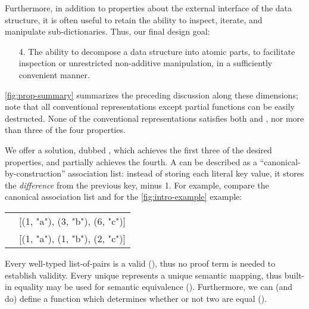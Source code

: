 Furthermore, in addition to properties about the external interface of the data structure, it is often useful to retain the ability to inspect, iterate, and manipulate sub-dictionaries.
%
Thus, our final design goal:

\begin{enumerate}

\item[4.]
%
\designGoal{\EzDstr}
%
The ability to decompose a data structure into atomic parts, to facilitate inspection or unrestricted non-additive manipulation, in a sufficiently convenient manner.

\end{enumerate}

\autoref{fig:prop-summary} summarizes the preceding discussion along these dimensions; note that all conventional representations except partial functions can be easily destructed.
%
%
%
None of the conventional representations satisfies both \SemTot{} and \SemInj{}, nor more than three of the four properties.



%
We offer a solution, dubbed \emph{\dds{}}, which achieves the first three of the desired properties, and partially achieves the fourth.
%
%
A \dd{} can be described as a ``canonical-by-construction'' association list: instead of storing each literal key value, it stores the \emph{difference} from the previous key, minus 1.
%
For example, compare the canonical association list and \dd{} for the \autoref{fig:intro-example} example:

\vsepRule

\begin{tabular}{ l l }
 \Cal{} & [(1, "a"), (3, "b"), (6, "c")] \\
 \Dd{}  & [(1, "a"), (1, "b"), (2, "c")]
\end{tabular}

\vsepRule

Every well-typed list-of-pairs is a valid \dd{} (\SemTot), thus no proof term is needed to establish validity.
%
Every unique \dd{} represents a unique semantic mapping, thus built-in equality may be used for semantic equivalence (\SemInj).
%
%
Furthermore, we can (and do) define a function which determines whether or not two \dds{} are equal (\EqDec).


